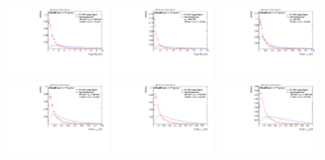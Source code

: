 \begin{figure}
\includegraphics[width=0.3\textwidth]{sascha_input/Appendix/Distributions/w/distributions/beta2/h_normal_tj_D2_2_bin5.pdf} \hspace{1mm}
\includegraphics[width=0.3\textwidth]{sascha_input/Appendix/Distributions/w/distributions/beta2/h_normal_tj_D2_2_bin6.pdf}
\bigskip
\includegraphics[width=0.3\textwidth]{sascha_input/Appendix/Distributions/w/distributions/beta2/h_normal_tj_nSub21_2_bin1.pdf} \hspace{1mm}
\includegraphics[width=0.3\textwidth]{sascha_input/Appendix/Distributions/w/distributions/beta2/h_normal_tj_nSub21_2_bin2.pdf} \hspace{1mm}
\includegraphics[width=0.3\textwidth]{sascha_input/Appendix/Distributions/w/distributions/beta2/h_normal_tj_nSub21_2_bin3.pdf} 
\bigskip
\includegraphics[width=0.3\textwidth]{sascha_input/Appendix/Distributions/w/distributions/beta2/h_normal_tj_nSub21_2_bin4.pdf} \hspace{6mm}

\end{figure}
